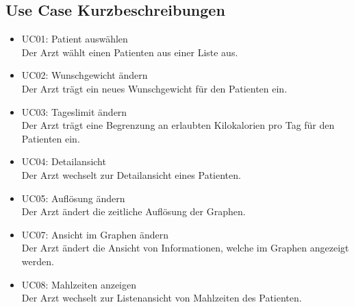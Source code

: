 \subsection{Use Case Kurzbeschreibungen}

\begin{itemize}
 \item UC01: Patient ausw\"ahlen\\
 Der Arzt w\"ahlt einen Patienten aus einer Liste aus.
 \item UC02: Wunschgewicht \"andern\\
 Der Arzt tr\"agt ein neues Wunschgewicht f\"ur den Patienten ein.
 \item UC03: Tageslimit \"andern\\
 Der Arzt tr\"agt eine Begrenzung an erlaubten Kilokalorien pro Tag f\"ur den Patienten ein.
 \item UC04: Detailansicht\\
 Der Arzt wechselt zur Detailansicht eines Patienten.
 \item UC05: Aufl\"osung \"andern\\
 Der Arzt \"andert die zeitliche Aufl\"osung der Graphen.
 \item UC07: Ansicht im Graphen \"andern\\
 Der Arzt \"andert die Ansicht von Informationen, welche im Graphen angezeigt werden.
 \item UC08: Mahlzeiten anzeigen\\
 Der Arzt wechselt zur Listenansicht von Mahlzeiten des Patienten.
\end{itemize}
